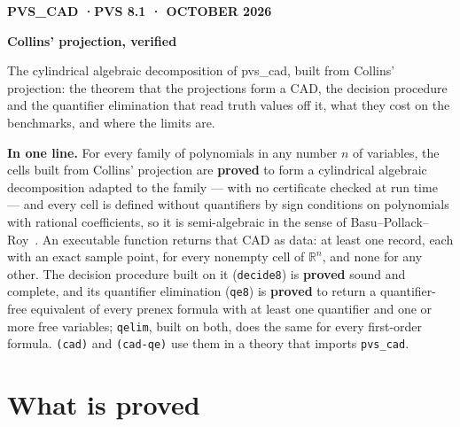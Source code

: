 \documentclass[11pt]{article}
\begin{document}
\thispagestyle{empty}
\begin{flushleft}
{\sffamily\small\bfseries\color{moss}\MakeUppercase{pvs\_cad \quad·\quad PVS 8.1 \quad· October 2026}}\par\vspace{8pt}
{\fontsize{27}{33}\selectfont\bfseries Collins' projection, verified}\par\vspace{10pt}
{\large\color{muted} The cylindrical algebraic decomposition of pvs\_cad, built from Collins' projection: the
theorem that the projections form a CAD, the decision procedure and the quantifier elimination that read truth
values off it, what they cost on the benchmarks, and where the limits are.}
\end{flushleft}
\vspace{4pt}

\begin{keybox}
\textbf{In one line.} For every family of polynomials in any number $n$ of variables, the cells built from Collins'
projection are \textbf{proved} to form a cylindrical algebraic decomposition adapted to the family --- with no
certificate checked at run time --- and every cell is defined without quantifiers by sign conditions on polynomials
with rational coefficients, so it is semi-algebraic in the sense of Basu--Pollack--Roy~\cite{bpr}. An executable function
returns that CAD as data: at least one record, each with an exact sample point, for every nonempty cell of
$\mathbb{R}^n$, and none for any other. The decision
procedure built on it (\texttt{decide8}) is \textbf{proved} sound and complete, and its quantifier elimination
(\texttt{qe8}) is \textbf{proved} to return a quantifier-free equivalent of every prenex formula with at least one
quantifier and one or more free variables; \texttt{qelim}, built on both, does the same for every first-order
formula. \texttt{(cad)} and \texttt{(cad-qe)} use them in a theory that imports \texttt{pvs\_cad}.
\end{keybox}

\section{What is proved}
\end{document}
